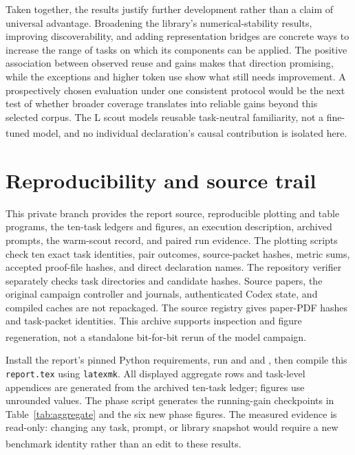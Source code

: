 \documentclass[10pt,a4paper]{article}
\newcommand{\src}[1]{\textsuperscript{\cite{#1}}}
\begin{document}
Taken together, the results justify further development rather than a
claim of universal advantage. Broadening the library's numerical-stability
results, improving discoverability, and adding representation bridges are
concrete ways to increase the range of tasks on which its components can
be applied. The positive association between observed reuse and gains makes
that direction promising, while the exceptions and higher token use show
what still needs improvement. A prospectively chosen evaluation under one
consistent protocol would be the next test of whether broader coverage
translates into reliable gains beyond this selected corpus. The L scout
models reusable task-neutral familiarity, not a fine-tuned model, and no
individual declaration's causal contribution is isolated here.
\src{summary,phasepoints,scope30,protocol}

\clearpage
\section{Reproducibility and source trail}

This private branch provides the report source, reproducible plotting and
table programs, the ten-task ledgers and figures, an execution description,
archived prompts, the warm-scout record, and paired run evidence. The
plotting scripts check ten exact task identities, pair outcomes,
source-packet hashes, metric sums, accepted proof-file hashes, and direct
declaration names.
The repository verifier separately checks task directories and candidate
hashes. Source papers, the original campaign controller and journals,
authenticated Codex state, and compiled caches are not repackaged. The
source registry gives paper-PDF hashes and task-packet identities. This
archive supports inspection and figure regeneration, not a standalone
bit-for-bit rerun of the model campaign.\src{readme,summary,registry,evidence}

Install the report's pinned Python requirements, run
 and
 and
, then compile this
\texttt{report.tex} using \texttt{latexmk}. All displayed aggregate rows
and task-level appendices are generated from the archived ten-task ledger;
figures use unrounded values. The phase script generates the running-gain
checkpoints in Table~\ref{tab:aggregate} and the six new phase figures.
The measured evidence is read-only: changing
any task, prompt, or library snapshot would require a new benchmark identity
rather than an edit to these results.\src{plotcode,phaseplotcode,readme,taskledger}
\end{document}
